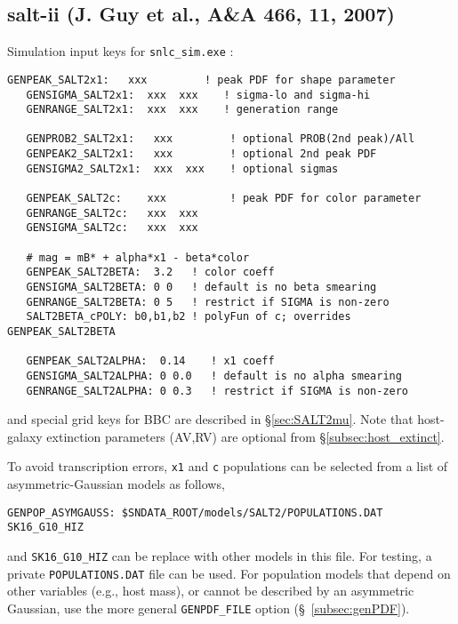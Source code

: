 \documentclass[12pt]{article}
\newcommand{\SALTII}{{\sc salt-ii}}
\begin{document}
\clearpage
\subsection{{\SALTII} {\small (J. Guy et al., {\bf A\&A 466}, 11, 2007)} }
\label{subsec:salt2}

\noindent
Simulation input keys  for {\tt snlc\_sim.exe} :
\begin{Verbatim}[frame=single]
   GENPEAK_SALT2x1:   xxx         ! peak PDF for shape parameter
   GENSIGMA_SALT2x1:  xxx  xxx    ! sigma-lo and sigma-hi
   GENRANGE_SALT2x1:  xxx  xxx    ! generation range

   GENPROB2_SALT2x1:   xxx         ! optional PROB(2nd peak)/All
   GENPEAK2_SALT2x1:   xxx         ! optional 2nd peak PDF
   GENSIGMA2_SALT2x1:  xxx  xxx    ! optional sigmas

   GENPEAK_SALT2c:    xxx          ! peak PDF for color parameter
   GENRANGE_SALT2c:   xxx  xxx
   GENSIGMA_SALT2c:   xxx  xxx

   # mag = mB* + alpha*x1 - beta*color
   GENPEAK_SALT2BETA:  3.2   ! color coeff
   GENSIGMA_SALT2BETA: 0 0   ! default is no beta smearing
   GENRANGE_SALT2BETA: 0 5   ! restrict if SIGMA is non-zero
   SALT2BETA_cPOLY: b0,b1,b2 ! polyFun of c; overrides GENPEAK_SALT2BETA

   GENPEAK_SALT2ALPHA:  0.14    ! x1 coeff
   GENSIGMA_SALT2ALPHA: 0 0.0   ! default is no alpha smearing
   GENRANGE_SALT2ALPHA: 0 0.3   ! restrict if SIGMA is non-zero
\end{Verbatim}
%
and special grid keys for BBC are described in 
\S\ref{sec:SALT2mu}.
Note that host-galaxy extinction parameters (AV,RV) 
are optional from \S\ref{subsec:host_extinct}.

\bigskip
To avoid transcription errors, {\tt x1} and {\tt c} populations can be
selected from a list of asymmetric-Gaussian models as follows,
\begin{Verbatim}[frame=single]
   GENPOP_ASYMGAUSS: $SNDATA_ROOT/models/SALT2/POPULATIONS.DAT SK16_G10_HIZ
\end{Verbatim}
%
and {\tt SK16\_G10\_HIZ} can be replace with other models in this file.
For testing, a private {\tt POPULATIONS.DAT} file can be used.
For population models that depend on other variables (e.g., host mass),
or cannot be described by an asymmetric Gaussian, 
use the more general {\tt GENPDF\_FILE} option
(\S~\ref{subsec:genPDF}).
\end{document}
